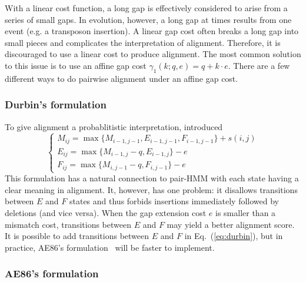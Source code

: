 \documentclass{bioinfo}
\begin{document}
With a linear cost function, a long gap is effectively considered to arise from
a series of small gaps. In evolution, however, a long gap at times results from
one event (e.g. a transposon insertion). A linear gap cost often breaks a long
gap into small pieces and complicates the interpretation of alignment.
Therefore, it is discouraged to use a linear cost to produce alignment. The
most common solution to this issue is to use an affine gap cost
$\gamma_1(k;q,e)=q+k\cdot e$. There are a few different ways to do pairwise
alignment under an affine gap cost.

\subsubsection{Durbin's formulation}

To give alignment a probablitistic interpretation, \citep{Durbin:1998uq} 
introduced
\begin{equation}\label{eq:durbin}
\left\{\begin{array}{l}
M_{ij}=\max\{M_{i-1,j-1}, E_{i-1,j-1}, F_{i-1,j-1}\} + s(i,j)\\
E_{ij}=\max\{M_{i-1,j}-q, E_{i-1,j}\} - e\\
F_{ij}=\max\{M_{i,j-1}-q, F_{i,j-1}\} - e
\end{array}\right.
\end{equation}
This formulation has a natural connection to pair-HMM with each state having a
clear meaning in alignment. It, however, has one problem: it disallows
transitions between $E$ and $F$ states and thus forbids insertions immediately
followed by deletions (and vice versa). When the gap extension cost $e$ is
smaller than a mismatch cost, transitions between $E$ and $F$ may yield a
better alignment score. It is possible to add transitions between $E$ and $F$
in Eq.~(\ref{eq:durbin}), but in practice, AE86's
formulation~\citep{Altschul:1986aa} will be faster to implement.

\subsubsection{AE86's formulation}
\end{document}
